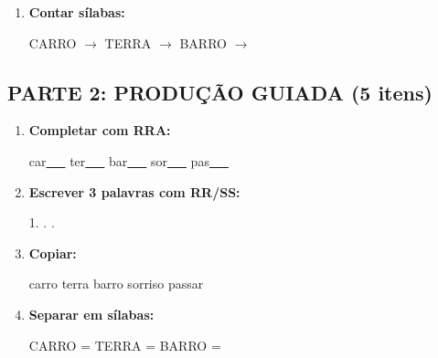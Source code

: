\begin{exercicio}
\begin{enumerate}
  \item \textbf{Contar sílabas:}
  \begin{center}
  CARRO $\rightarrow$ \underline{\hspace{0.9cm}} \quad TERRA $\rightarrow$ \underline{\hspace{0.9cm}} \quad BARRO $\rightarrow$ \underline{\hspace{0.9cm}}
  \end{center}

\end{enumerate}

\subsection*{PARTE 2: PRODUÇÃO GUIADA (5 itens)}

\begin{enumerate}[resume]

  \item \textbf{Completar com RRA:}
  \begin{center}
  car\underline{~~~} \quad ter\underline{~~~} \quad bar\underline{~~~} \quad sor\underline{~~~} \quad pas\underline{~~~}
  \end{center}

  \item \textbf{Escrever 3 palavras com RR/SS:}
  \begin{center}
  1. \underline{\hspace{3cm}} . \underline{\hspace{3cm}} . \underline{\hspace{3cm}}
  \end{center}

  \item \textbf{Copiar:}
  \begin{center}
  carro \quad terra \quad barro \quad sorriso \quad passar
  \end{center}

  \item \textbf{Separar em sílabas:}
  \begin{center}
  CARRO = \underline{\hspace{1cm}} \underline{\hspace{1cm}} \quad TERRA = \underline{\hspace{1cm}} \underline{\hspace{1cm}} \quad BARRO = \underline{\hspace{1cm}} \underline{\hspace{1cm}}
  \end{center}


\end{enumerate}
\end{exercicio}
